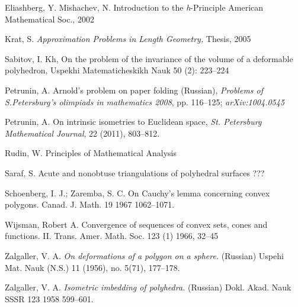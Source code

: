 \begin{thebibliography}{52}
 Eliashberg, Y.  Mishachev, N. Introduction to the \textit{h}-Principle American Mathematical Soc., 2002

 Krat, S. \textit{Approximation Problems in Length Geometry,} Thesis, 2005

 Sabitov, I. Kh, On the problem of the invariance of the volume of a deformable polyhedron,  
Uspekhi Matematicheskikh Nauk 50 (2): 223--224


  Petrunin, A.  Arnold's problem on paper folding (Russian), \textit{Problems of S.Petersburg's olimpiads in mathematics 2008}, pp. 116--125; \textit{arXiv:1004.0545}

 Petrunin, A.
On intrinsic isometries to Euclidean space, 
\textit{St. Petersburg Mathematical Journal}, 22 (2011), 803--812.

Rudin, W. Principles of Mathematical Analysis

  Saraf, S. Acute and nonobtuse triangulations of polyhedral surfaces ??? 

Schoenberg, I. J.; Zaremba, S. C.
On Cauchy's lemma concerning convex polygons. 
Canad. J. Math. 19 1967 1062--1071.

 Wijsman, Robert A. Convergence of sequences of convex sets, cones and functions. II. Trans. Amer. Math. Soc.  123 (1) 1966, 32--45

Zalgaller, V. A.
\textit{On deformations of a polygon on a sphere.} (Russian)
Uspehi Mat. Nauk (N.S.) 11 (1956), no. 5(71), 177--178.

 Zalgaller, V. A. 
\textit{Isometric imbedding of polyhedra.} (Russian)  Dokl. Akad. Nauk SSSR  123  1958 599--601.
\end{thebibliography}
